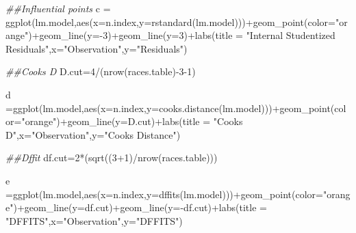 \documentclass[
  letterpaper,
  DIV=11,
  numbers=noendperiod]{scrreprt}
\newenvironment{Shaded}{\begin{snugshade}}{\end{snugshade}}
\newcommand{\AttributeTok}[1]{\textcolor[rgb]{0.40,0.45,0.13}{#1}}
\newcommand{\DecValTok}[1]{\textcolor[rgb]{0.68,0.00,0.00}{#1}}
\newcommand{\DocumentationTok}[1]{\textcolor[rgb]{0.37,0.37,0.37}{\textit{#1}}}
\newcommand{\FunctionTok}[1]{\textcolor[rgb]{0.28,0.35,0.67}{#1}}
\newcommand{\NormalTok}[1]{\textcolor[rgb]{0.00,0.23,0.31}{#1}}
\newcommand{\OtherTok}[1]{\textcolor[rgb]{0.00,0.23,0.31}{#1}}
\newcommand{\SpecialCharTok}[1]{\textcolor[rgb]{0.37,0.37,0.37}{#1}}
\newcommand{\StringTok}[1]{\textcolor[rgb]{0.13,0.47,0.30}{#1}}
\begin{document}
\begin{Shaded}
\begin{Highlighting}[]
\DocumentationTok{\#\#Influential points}
\NormalTok{c }\OtherTok{=} \FunctionTok{ggplot}\NormalTok{(lm.model,}\FunctionTok{aes}\NormalTok{(}\AttributeTok{x=}\NormalTok{n.index,}\AttributeTok{y=}\FunctionTok{rstandard}\NormalTok{(lm.model)))}\SpecialCharTok{+}\FunctionTok{geom\_point}\NormalTok{(}\AttributeTok{color=}\StringTok{"orange"}\NormalTok{)}\SpecialCharTok{+}\FunctionTok{geom\_line}\NormalTok{(}\AttributeTok{y=}\SpecialCharTok{{-}}\DecValTok{3}\NormalTok{)}\SpecialCharTok{+}\FunctionTok{geom\_line}\NormalTok{(}\AttributeTok{y=}\DecValTok{3}\NormalTok{)}\SpecialCharTok{+}\FunctionTok{labs}\NormalTok{(}\AttributeTok{title =} \StringTok{"Internal Studentized Residuals"}\NormalTok{,}\AttributeTok{x=}\StringTok{"Observation"}\NormalTok{,}\AttributeTok{y=}\StringTok{"Residuals"}\NormalTok{)}

\DocumentationTok{\#\#Cook\textquotesingle{}s D}
\NormalTok{D.cut}\OtherTok{=}\DecValTok{4}\SpecialCharTok{/}\NormalTok{(}\FunctionTok{nrow}\NormalTok{(races.table)}\SpecialCharTok{{-}}\DecValTok{3{-}1}\NormalTok{)}

\NormalTok{d }\OtherTok{=}\FunctionTok{ggplot}\NormalTok{(lm.model,}\FunctionTok{aes}\NormalTok{(}\AttributeTok{x=}\NormalTok{n.index,}\AttributeTok{y=}\FunctionTok{cooks.distance}\NormalTok{(lm.model)))}\SpecialCharTok{+}\FunctionTok{geom\_point}\NormalTok{(}\AttributeTok{color=}\StringTok{"orange"}\NormalTok{)}\SpecialCharTok{+}\FunctionTok{geom\_line}\NormalTok{(}\AttributeTok{y=}\NormalTok{D.cut)}\SpecialCharTok{+}\FunctionTok{labs}\NormalTok{(}\AttributeTok{title =} \StringTok{"Cook\textquotesingle{}s D"}\NormalTok{,}\AttributeTok{x=}\StringTok{"Observation"}\NormalTok{,}\AttributeTok{y=}\StringTok{"Cook\textquotesingle{}s Distance"}\NormalTok{)}

\DocumentationTok{\#\#Dffit}
\NormalTok{df.cut}\OtherTok{=}\DecValTok{2}\SpecialCharTok{*}\NormalTok{(}\FunctionTok{sqrt}\NormalTok{((}\DecValTok{3}\SpecialCharTok{+}\DecValTok{1}\NormalTok{)}\SpecialCharTok{/}\FunctionTok{nrow}\NormalTok{(races.table)))}

\NormalTok{e }\OtherTok{=}\FunctionTok{ggplot}\NormalTok{(lm.model,}\FunctionTok{aes}\NormalTok{(}\AttributeTok{x=}\NormalTok{n.index,}\AttributeTok{y=}\FunctionTok{dffits}\NormalTok{(lm.model)))}\SpecialCharTok{+}\FunctionTok{geom\_point}\NormalTok{(}\AttributeTok{color=}\StringTok{"orange"}\NormalTok{)}\SpecialCharTok{+}\FunctionTok{geom\_line}\NormalTok{(}\AttributeTok{y=}\NormalTok{df.cut)}\SpecialCharTok{+}\FunctionTok{geom\_line}\NormalTok{(}\AttributeTok{y=}\SpecialCharTok{{-}}\NormalTok{df.cut)}\SpecialCharTok{+}\FunctionTok{labs}\NormalTok{(}\AttributeTok{title =} \StringTok{"DFFITS"}\NormalTok{,}\AttributeTok{x=}\StringTok{"Observation"}\NormalTok{,}\AttributeTok{y=}\StringTok{"DFFITS"}\NormalTok{)}


\end{Highlighting}
\end{Shaded}
\end{document}
